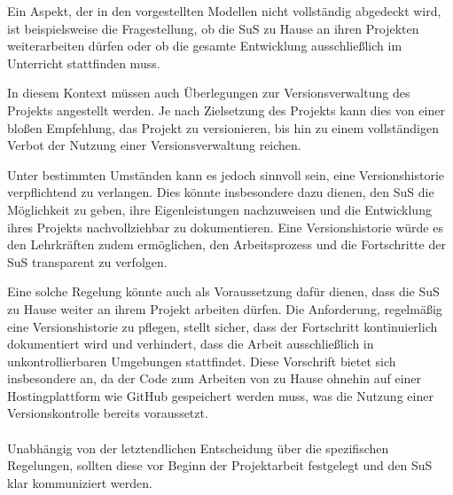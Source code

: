 \documentclass[a4paper,12pt]{article}
\begin{document}
Ein Aspekt, der in den vorgestellten Modellen nicht vollständig abgedeckt wird, ist beispielsweise die Fragestellung, ob die SuS zu Hause an ihren Projekten weiterarbeiten dürfen oder ob die gesamte Entwicklung ausschließlich im Unterricht stattfinden muss.

In diesem Kontext müssen auch Überlegungen zur Versionsverwaltung des Projekts angestellt werden. Je nach Zielsetzung des Projekts kann dies von einer bloßen Empfehlung, das Projekt zu versionieren, bis hin zu einem vollständigen Verbot der Nutzung einer Versionsverwaltung reichen.

Unter bestimmten Umständen kann es jedoch sinnvoll sein, eine Versionshistorie verpflichtend zu verlangen. Dies könnte insbesondere dazu dienen, den SuS die Möglichkeit zu geben, ihre Eigenleistungen nachzuweisen und die Entwicklung ihres Projekts nachvollziehbar zu dokumentieren. Eine Versionshistorie würde es den Lehrkräften zudem ermöglichen, den Arbeitsprozess und die Fortschritte der SuS transparent zu verfolgen.

Eine solche Regelung könnte auch als Voraussetzung dafür dienen, dass die SuS zu Hause weiter an ihrem Projekt arbeiten dürfen. Die Anforderung, regelmäßig eine Versionshistorie zu pflegen, stellt sicher, dass der Fortschritt kontinuierlich dokumentiert wird und verhindert, dass die Arbeit ausschließlich in unkontrollierbaren Umgebungen stattfindet. Diese Vorschrift bietet sich insbesondere an, da der Code zum Arbeiten von zu Hause ohnehin auf einer Hostingplattform wie GitHub gespeichert werden muss, was die Nutzung einer Versionskontrolle bereits voraussetzt.\\
\\

Unabhängig von der letztendlichen Entscheidung über die spezifischen Regelungen, sollten diese vor Beginn der Projektarbeit festgelegt und den SuS klar kommuniziert werden. 
\end{document}
